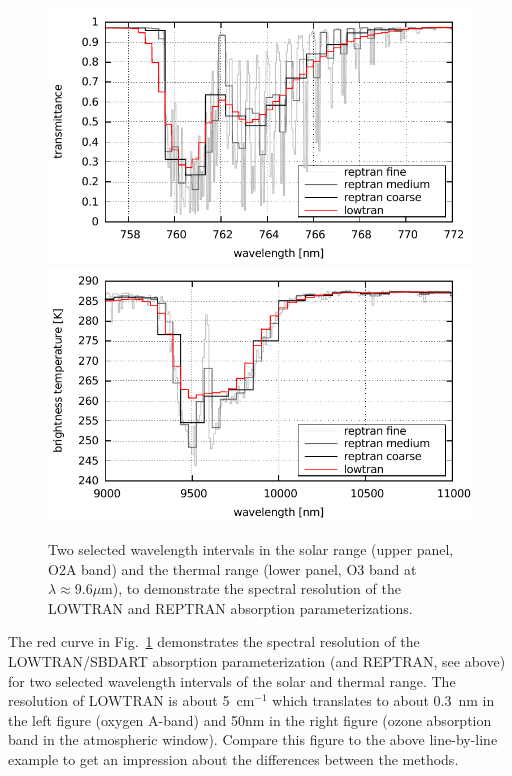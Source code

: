 \begin{figure}
  \centering
  \includegraphics[width=1.0\hsize]{figs/resolution_o2a.pdf}
  \includegraphics[width=1.0\hsize]{figs/resolution_o3.pdf}
  \caption{Two selected wavelength intervals in the
    solar range (upper panel, O2A band) and the thermal range 
    (lower panel, O3 band at $\lambda\approx9.6\mu$m), to demonstrate the spectral resolution of the
    LOWTRAN and REPTRAN absorption parameterizations.}
  \label{fig:o2a}
\end{figure}

The red curve in Fig.~\ref{fig:o2a} demonstrates the spectral resolution of the LOWTRAN/SBDART 
absorption parameterization (and REPTRAN, see above)
for two selected wavelength intervals of the solar and thermal range.
The resolution of LOWTRAN is about 5~cm$^{-1}$ which translates to about 0.3~nm in the
left figure (oxygen A-band) and 50nm in the right figure (ozone
absorption band in the atmospheric window). Compare this figure to the
above line-by-line example to get an impression about the differences
between the methods.


